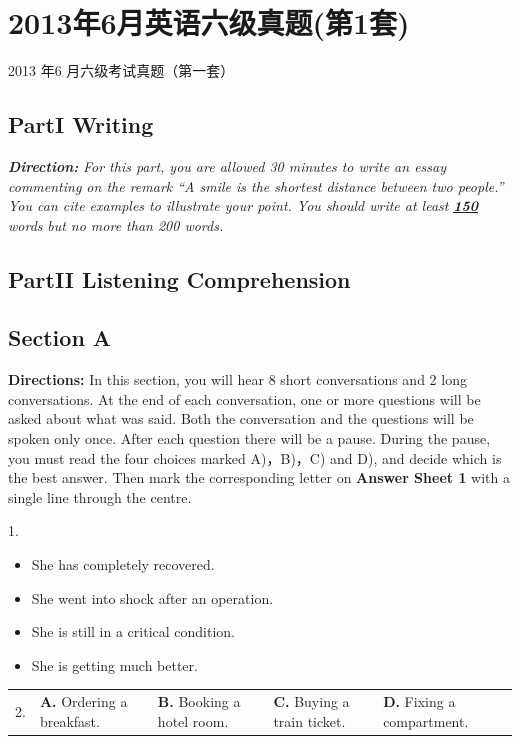 \documentclass[UTF8,11pt]{ctexart}
\begin{document}
\section*{2013年6月英语六级真题(第1套)}
2013 年6 月六级考试真题（第一套）


\subsection*{\textbf{Part}I \textbf{Writing}}


\textbf{\textit{Direction:}}\textit{ For this part, you are allowed 30 minutes to write an essay commenting on the remark “A smile is the shortest} \textit{distance between two people.” You can cite examples to illustrate your point. You should write at least}\textbf{\textit{ }}\textbf{\textit{\uline{150}}}\textit{ words} \textit{but no more than 200 words.}


\subsection*{\textbf{Part}II \textbf{Listening Comprehension}}


\subsection*{\textbf{Section A}}


\textbf{Directions:} In this section, you will hear 8 short conversations and 2 long conversations. At the end of each conversation, one or more questions will be asked about what was said. Both the conversation and the questions will be spoken only once. After each question there will be a pause. During the pause, you must read the four choices marked A)，B)，C) and D), and decide which is the best answer. Then mark the corresponding letter on\textbf{ Answer Sheet 1} with a single line through the centre.


1.


\begin{itemize}[leftmargin=2em,itemsep=.2em,topsep=.4em]\item[A.] She has completely recovered.
\item[B.] She went into shock after an operation.
\item[C.] She is still in a critical condition.
\item[D.] She is getting much better.
\end{itemize}

\noindent\begin{tabularx}{\linewidth}{@{}lXXXX@{}}2. & \textbf{A.} Ordering a breakfast. & \textbf{B.} Booking a hotel room. & \textbf{C.} Buying a train ticket. & \textbf{D.} Fixing a compartment.\\\end{tabularx}\par
\end{document}
